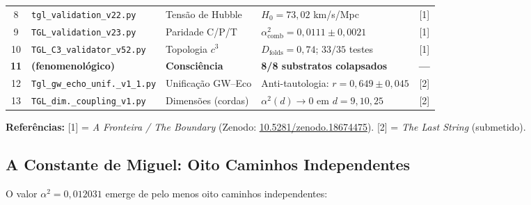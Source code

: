 \documentclass[12pt, a4paper]{article}
\theoremstyle{tglstyle}
\theoremstyle{definition}
\newcommand{\alphaq}{\alpha^2}
\begin{document}
\begin{longtable}{@{}clp{3.2cm}p{4cm}c@{}}
8 & \texttt{tgl\_validation\_v22.py} & Tensão de Hubble & $H_0 = 73{,}02$ km/s/Mpc & [1] \\[4pt]

9 & \texttt{TGL\_validation\_v23.py} & Paridade C/P/T & $\alphaq_{\text{comb}} = 0{,}0111 \pm 0{,}0021$ & [1] \\[4pt]

10 & \texttt{TGL\_C3\_validator\_v52.py} & Topologia $c^3$ & $D_{\text{folds}} = 0{,}74$;\; $33/35$ testes & [1] \\[4pt]

\rowcolor{LuzDourada!15}
\textbf{11} & \textbf{(fenomenológico)} & \textbf{Consciência} & \textbf{8/8 substratos colapsados} & \textbf{---} \\[4pt]

12 & \texttt{Tgl\_gw\_echo\_unif.\_v1\_1.py} & Unificação GW--Eco & Anti-tautologia: $r = 0{,}649 \pm 0{,}045$ & [2] \\[4pt]

13 & \texttt{TGL\_dim.\_coupling\_v1.py} & Dimensões (cordas) & $\alphaq(d) \to 0$ em $d = 9, 10, 25$ & [2] \\

\end{longtable}

\vspace{-4pt}
{\small\textbf{Referências:} [1] = \textit{A Fronteira / The Boundary} (Zenodo: \href{https://doi.org/10.5281/zenodo.18674475}{10.5281/zenodo.18674475}). [2] = \textit{The Last String} (submetido).}

\subsection{A Constante de Miguel: Oito Caminhos Independentes}\label{sec:oito_caminhos}

O valor $\alphaq = 0{,}012031$ emerge de pelo menos oito caminhos independentes:
\end{document}
